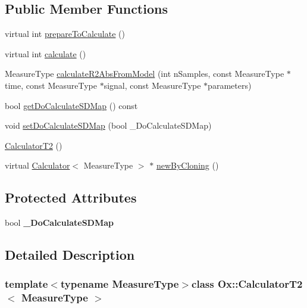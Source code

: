 \subsection*{Public Member Functions}
\begin{DoxyCompactItemize}
\item 
virtual int \hyperlink{class_ox_1_1_calculator_t2_a56e2bcb27465a83dd1a1150b7fe419c8}{prepare\-To\-Calculate} ()
\item 
virtual int \hyperlink{class_ox_1_1_calculator_t2_a8afe4974f3253edea4386a87695607ae}{calculate} ()
\item 
Measure\-Type \hyperlink{class_ox_1_1_calculator_t2_ace5f0515839bdffffb3d60e4536167b6}{calculate\-R2\-Abs\-From\-Model} (int n\-Samples, const Measure\-Type $\ast$time, const Measure\-Type $\ast$signal, const Measure\-Type $\ast$parameters)
\item 
bool \hyperlink{class_ox_1_1_calculator_t2_ab5d0e963ac87d04ae47ecd2a9f10059f}{get\-Do\-Calculate\-S\-D\-Map} () const 
\item 
void \hyperlink{class_ox_1_1_calculator_t2_a5dc0b27caa7a50cca6c63a48f6733b47}{set\-Do\-Calculate\-S\-D\-Map} (bool \-\_\-\-Do\-Calculate\-S\-D\-Map)
\item 
\hyperlink{class_ox_1_1_calculator_t2_a9d0d9d252c322a6db51693ef42c0bed7}{Calculator\-T2} ()
\item 
virtual \hyperlink{class_ox_1_1_calculator}{Calculator}$<$ Measure\-Type $>$ $\ast$ \hyperlink{class_ox_1_1_calculator_t2_aaec3b1e6254b67b309c9beedb54ad9e7}{new\-By\-Cloning} ()
\end{DoxyCompactItemize}
\subsection*{Protected Attributes}
\begin{DoxyCompactItemize}
\item 
\hypertarget{class_ox_1_1_calculator_t2_abf89edd4cfbf3ca97149ca6d5c4f5bdc}{bool {\bfseries \-\_\-\-Do\-Calculate\-S\-D\-Map}}\label{class_ox_1_1_calculator_t2_abf89edd4cfbf3ca97149ca6d5c4f5bdc}

\end{DoxyCompactItemize}


\subsection{Detailed Description}
\subsubsection*{template$<$typename Measure\-Type$>$class Ox\-::\-Calculator\-T2$<$ Measure\-Type $>$}


